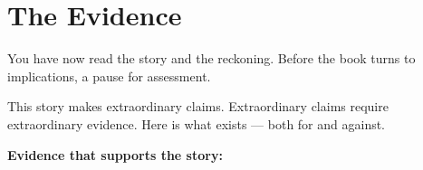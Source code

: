 

\chapter*{The Evidence}

You have now read the story and the reckoning. Before the book turns to implications, a pause for assessment.

This story makes extraordinary claims. Extraordinary claims require extraordinary evidence. Here is what exists --- both for and against.

\vspace{0.5cm}

\textbf{Evidence that supports the story:}

